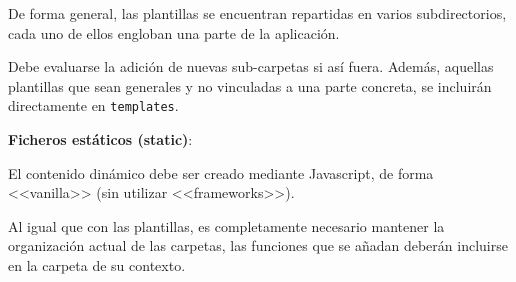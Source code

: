 De forma general, las plantillas se encuentran repartidas en varios
subdirectorios, cada uno de ellos engloban una parte de la aplicación.

\begin{figure}[H]
\end{figure}

Debe evaluarse la adición de nuevas sub-carpetas si así fuera. Además, aquellas
plantillas que sean generales y no vinculadas a una parte concreta, se incluirán
directamente en \texttt{templates}.

\textbf{Ficheros estáticos (static)}: 

El contenido dinámico debe ser creado mediante Javascript, de forma <<vanilla>>
(sin utilizar <<frameworks>>). 

Al igual que con las plantillas, es completamente necesario mantener la
organización actual de las carpetas, las funciones que se añadan deberán
incluirse en la carpeta de su contexto.

